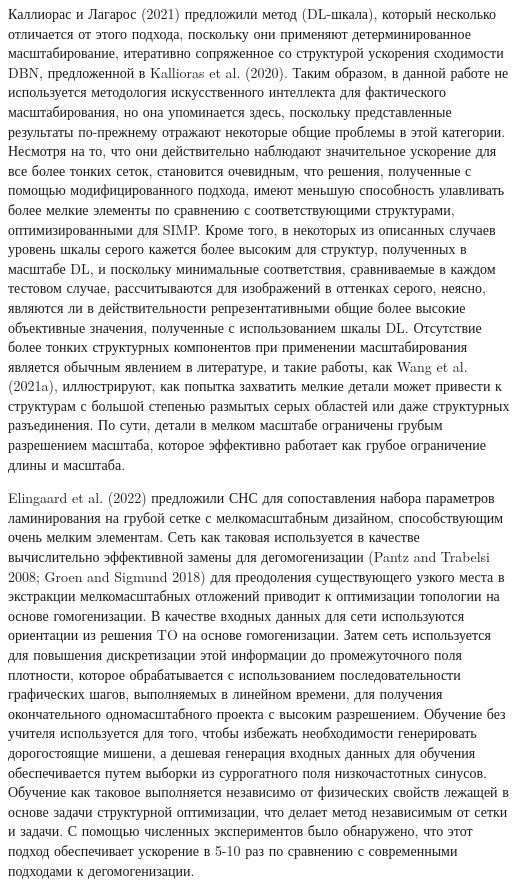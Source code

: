 Каллиорас и Лагарос (2021) предложили метод (DL-шкала), который несколько отличается от этого подхода, поскольку они применяют детерминированное масштабирование, итеративно сопряженное со структурой ускорения сходимости DBN, предложенной в Kallioras et al. (2020). Таким образом, в данной работе не используется методология искусственного интеллекта для фактического масштабирования, но она упоминается здесь, поскольку представленные результаты по-прежнему отражают некоторые общие проблемы в этой категории. Несмотря на то, что они действительно наблюдают значительное ускорение для все более тонких сеток, становится очевидным, что решения, полученные с помощью модифицированного подхода, имеют меньшую способность улавливать более мелкие элементы по сравнению с соответствующими структурами, оптимизированными для SIMP. Кроме того, в некоторых из описанных случаев уровень шкалы серого кажется более высоким для структур, полученных в масштабе DL, и поскольку минимальные соответствия, сравниваемые в каждом тестовом случае, рассчитываются для изображений в оттенках серого, неясно, являются ли в действительности репрезентативными общие более высокие объективные значения, полученные с использованием шкалы DL. Отсутствие более тонких структурных компонентов при применении масштабирования является обычным явлением в литературе, и такие работы, как Wang et al. (2021a), иллюстрируют, как попытка захватить мелкие детали может привести к структурам с большой степенью размытых серых областей или даже структурных разъединения. По сути, детали в мелком масштабе ограничены грубым разрешением масштаба, которое эффективно работает как грубое ограничение длины и масштаба.

Elingaard et al. (2022) предложили СНС для сопоставления набора параметров ламинирования на грубой сетке с мелкомасштабным дизайном, способствующим очень мелким элементам. Сеть как таковая используется в качестве вычислительно эффективной замены для дегомогенизации (Pantz and Trabelsi 2008; Groen and Sigmund 2018) для преодоления существующего узкого места в экстракции мелкомасштабных отложений приводит к оптимизации топологии на основе гомогенизации. В качестве входных данных для сети используются ориентации из решения TO на основе гомогенизации. Затем сеть используется для повышения дискретизации этой информации до промежуточного поля плотности, которое обрабатывается с использованием последовательности графических шагов, выполняемых в линейном времени, для получения окончательного одномасштабного проекта с высоким разрешением. Обучение без учителя используется для того, чтобы избежать необходимости генерировать дорогостоящие мишени, а дешевая генерация входных данных для обучения обеспечивается путем выборки из суррогатного поля низкочастотных синусов. Обучение как таковое выполняется независимо от физических свойств лежащей в основе задачи структурной оптимизации, что делает метод независимым от сетки и задачи. С помощью численных экспериментов было обнаружено, что этот подход обеспечивает ускорение в 5-10 раз по сравнению с современными подходами к дегомогенизации.

